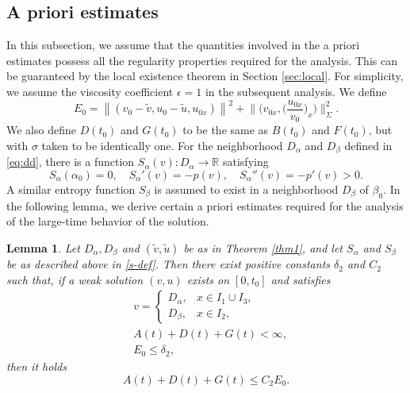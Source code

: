 \documentclass[a4paper,oneside,11pt]{article}
\numberwithin{equation}{section}
\newtheorem{lemma}{Lemma}[section]
\begin{document}
\subsection{A priori estimates}\label{a-priori}
\indent\qquad
In this subsection, we assume that the quantities involved in the a priori estimates possess all the regularity properties required for the analysis. This can be guaranteed by the local existence theorem in Section \ref{sec:local}.
For simplicity, we assume the viscosity coefficient $\epsilon=1$ in the subsequent analysis. 
We define
\begin{equation}\label{eq:E0}
	E_{0}= \left\|\left(v_{0}-\tilde{v}, u_{0}-\tilde{u}, u_{0 x}\right)\right\|^{2}+\Big\|\Big(v_{0 x},\big(\frac{u_{0x}}{v_{0}}\big)_{x}\Big)\Big\|_\Sigma^{2}.
\end{equation}
We also define \(D(t_0)\) and \(G(t_0)\) to be the same as \(B(t_0)\) and \(F(t_0)\), but with \(\sigma\) taken to be identically one. For the neighborhood $D_\alpha$ and $D_\beta$ defined in \eqref{eq:dd}, there is a function $S_\alpha(v) : D_\alpha \rightarrow \mathbb{R}$ satisfying
\begin{equation}\label{s-def}
  S_\alpha(\alpha_0) = 0, \quad S_\alpha'(v) = -p(v), \quad S_\alpha''(v)= -p'(v)> 0.
\end{equation}
A similar entropy function $S_\beta$ is assumed to exist in a neighborhood $D_\beta$ of $\beta_0$. 
In the following lemma, we derive certain a priori estimates required for the analysis of the large-time behavior of the solution. 
\begin{lemma}\label{lem-apriori}
Let $D_\alpha, D_\beta$ and $(\tilde{v},\tilde{u})$ be as in Theorem \ref{thm1}, and let $S_\alpha$ and $S_\beta$ be as described above in \eqref{s-def}. Then there exist positive constants $\delta_{2} $ and $C_{2}$ such that, if a weak solution $ (v, u) $ exists on $ \left[0, t_{0}\right] $ and satisfies
\begin{align*}
&v = 
\begin{cases}
D_\alpha, & x \in I_1 \cup I_3, \\
D_\beta, & x \in I_2,
\end{cases}  \\
&A(t)+D(t)+G(t)< \infty,  \\
&E_{0} \leq \delta_{2},
\end{align*}
then it holds 
\begin{equation*}
  A(t)+D(t)+G(t) \leq C_{2} E_{0}.
\end{equation*}
\end{lemma}
\end{document}

